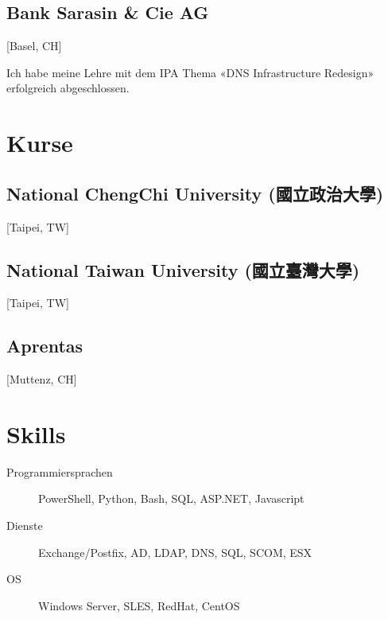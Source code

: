 \documentclass{cv}
\begin{document}
\begin{CJK*}{UTF8}{bsmi}
\subsection{Bank Sarasin \& Cie AG}[Basel, CH]
\begin{positions}
\end{positions}
Ich habe meine Lehre mit dem IPA Thema «DNS Infrastructure Redesign» erfolgreich abgeschlossen.

\section{Kurse}
\subsection{National ChengChi University (國立政治大學)}[Taipei, TW]
\begin{positions}
\end{positions}

\subsection{National Taiwan University (國立臺灣大學)}[Taipei, TW]
\begin{positions}
\end{positions}

\subsection{Aprentas}[Muttenz, CH]
\begin{positions}
\end{positions}

\section{Skills}
\begin{description}
\item[Programmiersprachen]
    \parbox[t]{\linegoal}{
    \strut%
    PowerShell, Python, Bash, SQL, ASP.NET, Javascript
    \strut%
    }
    \item[Dienste] Exchange/Postfix, AD, LDAP, DNS, SQL, SCOM, ESX
    \item[OS] Windows Server, SLES, RedHat, CentOS
\end{description}


\end{CJK*}
\end{document}
